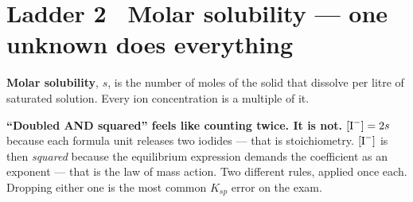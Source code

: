 \documentclass{apchem-worksheet}
\begin{document}
\section*{\sffamily Ladder 2 \textbullet\ Molar solubility --- one
unknown does everything}

\textbf{Molar solubility}, $s$, is the number of moles of the solid
that dissolve per litre of saturated solution. Every ion concentration
is a multiple of it.

\begin{center}
\end{center}

\begin{apctrap}
\textbf{``Doubled AND squared'' feels like counting twice. It is not.}
$[\ce{I-}] = 2s$ because each formula unit releases two iodides ---
that is stoichiometry. $[\ce{I-}]$ is then \emph{squared} because the
equilibrium expression demands the coefficient as an exponent --- that
is the law of mass action. Two different rules, applied once each.
Dropping either one is the most common $K_{sp}$ error on the exam.
\end{apctrap}
\end{document}
